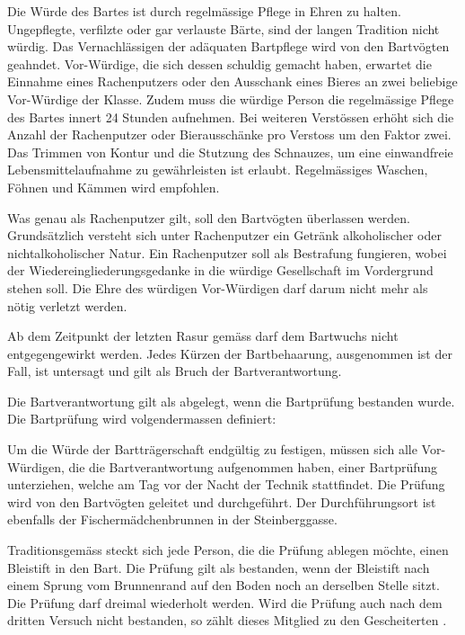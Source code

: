 \documentclass[fontsize=12pt,parskip=half]{scrartcl}
\begin{document}
\begin{contract}
  \SubClause[title={Bartpflege}]\label{B.bartpflege}
  Die Würde des Bartes ist durch regelmässige Pflege in Ehren zu halten. Ungepflegte, verfilzte oder gar
  verlauste Bärte, sind der langen Tradition nicht würdig. Das Vernachlässigen der adäquaten Bartpflege
  wird von den Bartvögten geahndet. Vor-Würdige, die sich dessen schuldig gemacht haben, erwartet die
  Einnahme eines Rachenputzers  oder den Ausschank eines Bieres an zwei beliebige Vor-Würdige der Klasse.
  Zudem muss die würdige Person die regelmässige Pflege des Bartes innert 24 Stunden aufnehmen. Bei
  weiteren Verstössen erhöht sich die Anzahl der Rachenputzer oder Bierausschänke pro Verstoss um den
  Faktor zwei. Das Trimmen von Kontur und die Stutzung des Schnauzes, um eine einwandfreie
  Lebensmittelaufnahme zu gewährleisten ist erlaubt. Regelmässiges Waschen, Föhnen und Kämmen wird empfohlen.

  \SubClause[title={Rachenputzer}]\label{B.rachenputzer}
  Was genau als Rachenputzer gilt, soll den Bartvögten überlassen werden. Grundsätzlich versteht sich unter
  Rachenputzer ein Getränk alkoholischer oder nichtalkoholischer Natur. Ein Rachenputzer soll als Bestrafung fungieren,
  wobei der Wiedereingliederungsgedanke in die würdige Gesellschaft im Vordergrund stehen soll.
  Die Ehre des würdigen Vor-Würdigen darf darum nicht mehr als nötig verletzt werden.

  \SubClause[title={Schneiden}]
  Ab dem Zeitpunkt der letzten Rasur gemäss  darf dem Bartwuchs nicht entgegengewirkt werden.
  Jedes Kürzen der Bartbehaarung, ausgenommen ist der Fall, ist untersagt und gilt als Bruch der Bartverantwortung.

  \Clause[title={Bartprüfung}]\label{B.bartpruefung}
  Die Bartverantwortung gilt als abgelegt, wenn die Bartprüfung bestanden wurde. Die Bartprüfung wird volgendermassen definiert:

  \SubClause[title={Durchführung}]
  Um die Würde der Bartträgerschaft endgültig zu festigen, müssen sich alle Vor-Würdigen, die die Bartverantwortung aufgenommen haben,
  einer Bartprüfung unterziehen, welche am Tag vor der Nacht der Technik stattfindet. Die Prüfung wird von den
  Bartvögten geleitet und durchgeführt. Der Durchführungsort ist ebenfalls der Fischermädchenbrunnen in der
  Steinberggasse.

  \SubClause[title={Handlung}]
  Traditionsgemäss steckt sich jede Person, die die Prüfung ablegen möchte, einen Bleistift in den Bart. Die
  Prüfung gilt als bestanden, wenn der Bleistift nach einem Sprung vom Brunnenrand auf den Boden noch an
  derselben Stelle sitzt. Die Prüfung darf dreimal wiederholt werden. Wird die Prüfung auch nach dem dritten Versuch nicht bestanden,
  so zählt dieses Mitglied zu den Gescheiterten .


\end{contract}
\end{document}
